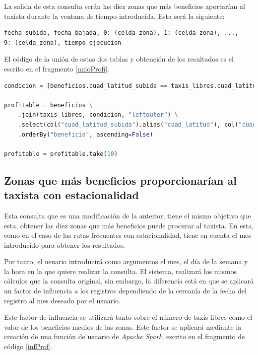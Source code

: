 La salida de esta consulta serán las diez zonas que más beneficios aportarían al taxista durante la ventana de tiempo introducida. Esta será la siguiente:

\begin{verbatim}
fecha_subida, fecha_bajada, 0: (celda_zona), 1: (celda_zona), ..., 
9: (celda_zona), tiempo_ejecucion
\end{verbatim}

El código de la unión de estas dos tablas y obtención de los resultados es el escrito en el fragmento \ref{unioProfi}.

\begin{lstlisting}[label=unioProfi,language=Python,frame=single,caption=Código de la unión de tablas de beneficios y taxis libres y obtención de los resultados de la consulta]
condicion = [beneficios.cuad_latitud_subida == taxis_libres.cuad_latitud_bajada, beneficios.cuad_longitud_subida == taxis_libres.cuad_longitud_bajada]

profitable = beneficios \
    .join(taxis_libres, condicion, "leftouter") \
    .select(col("cuad_latitud_subida").alias("cuad_latitud"), col("cuad_longitud_subida").alias("cuad_longitud"), (col("beneficios") / when(taxis_libres.taxis_libres > 0, (taxis_libres.taxis_libres + 1)).otherwise(1)).alias("beneficio")) \
    .orderBy("beneficio", ascending=False)

profitable = profitable.take(10)
\end{lstlisting}

\subsection{Zonas que más beneficios proporcionarían al taxista con estacionalidad}
Esta consulta que es una modificación de la anterior, tiene el mismo objetivo que esta, obtener las diez zonas que más beneficios puede procurar al taxista. En esta, como en el caso de las rutas frecuentes con estacionalidad, tiene en cuenta el mes introducido para obtener los resultados.

Por tanto, el usuario introducirá como argumentos el mes, el día de la semana y la hora en la que quiere realizar la consulta. El sistema, realizará los mismos cálculos que la consulta original, sin embargo, la diferencia está en que se aplicará un factor de influencia a los registros dependiendo de la cercanía de la fecha del registro al mes deseado por el usuario.

Este factor de influencia se utilizará tanto sobre el número de taxis libres como el valor de los beneficios medios de las zonas. Este factor se aplicará mediante la creación de una función de usuario de \textit{Apache Spark}, escrito en el fragmento de código \ref{infProf}.

